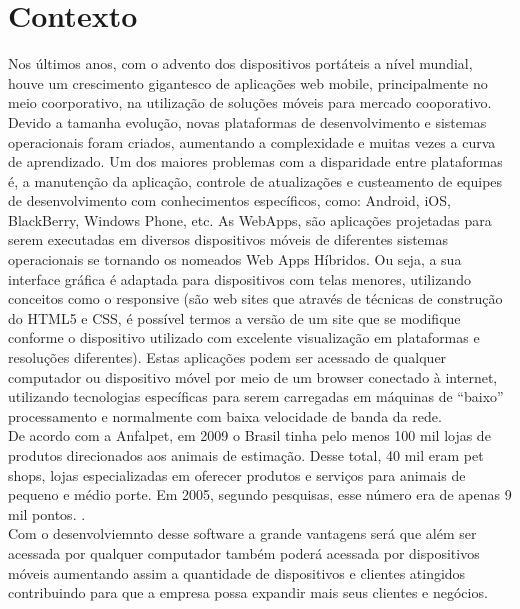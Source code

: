 \documentclass[12pt,openright,twoside,a4paper,english,french,spanish,brazil]{abntex2}
\begin{document}
\section*{Contexto}
Nos últimos anos, com o advento dos dispositivos portáteis a nível mundial, houve um crescimento gigantesco de aplicações web mobile, principalmente no meio coorporativo, na utilização de soluções móveis para mercado cooporativo. Devido a tamanha evolução, novas plataformas de desenvolvimento e sistemas operacionais foram criados, aumentando a complexidade e muitas vezes a curva de aprendizado. Um dos maiores problemas com a disparidade entre plataformas é, a manutenção da aplicação, controle de atualizações e custeamento de equipes de desenvolvimento com conhecimentos específicos, como: Android, iOS, BlackBerry, Windows Phone, etc.
As WebApps, são aplicações projetadas para serem executadas em diversos dispositivos móveis de diferentes sistemas operacionais se tornando os nomeados Web Apps Híbridos. Ou seja, a sua interface gráfica é adaptada para dispositivos com telas menores, utilizando conceitos como o responsive (são web sites que através de técnicas de construção do HTML5 e CSS, é possível termos a versão de um site que se modifique conforme o dispositivo utilizado com excelente visualização em plataformas e resoluções diferentes). Estas aplicações podem ser acessado de qualquer computador ou dispositivo móvel por meio de um browser conectado à internet, utilizando tecnologias específicas para serem carregadas em máquinas de “baixo” processamento e normalmente com baixa velocidade de banda da rede.\\
De acordo com a Anfalpet, em 2009 o Brasil tinha pelo menos 100 mil lojas de produtos direcionados aos animais de estimação. Desse total, 40 mil eram pet shops, lojas especializadas em oferecer produtos e serviços para animais de pequeno e médio porte. Em 2005, segundo pesquisas, esse número era de apenas 9 mil pontos. \cite{Sebrae2011}.\\
Com o desenvolviemnto desse software a grande vantagens será que além ser acessada por qualquer computador também poderá acessada por dispositivos móveis aumentando assim a quantidade de dispositivos e clientes atingidos contribuindo para que a empresa possa expandir mais seus clientes e negócios.

\end{document}
